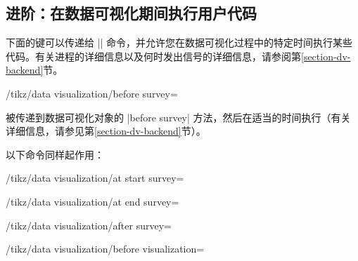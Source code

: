 \subsection{进阶：在数据可视化期间执行用户代码}
\label{section-dv-user-code}


下面的键可以传递给 |\datavisualization| 命令，并允许您在数据可视化过程中的特定时间执行某些代码。有关进程的详细信息以及何时发出信号的详细信息，请参阅第\ref{section-dv-backend}节。

\begin{key}{/tikz/data visualization/before survey=} %

     被传递到数据可视化对象的 |before survey| 方法，然后在适当的时间执行（有关详细信息，请参见第\ref{section-dv-backend}节）。


    以下命令同样起作用：
\end{key}
%
\begin{key}{/tikz/data visualization/at start survey=} %
\end{key}
%
\begin{key}{/tikz/data visualization/at end survey=} %
\end{key}
%
\begin{key}{/tikz/data visualization/after survey=} %
\end{key}
%
\begin{key}{/tikz/data visualization/before visualization=} %
\end{key}
